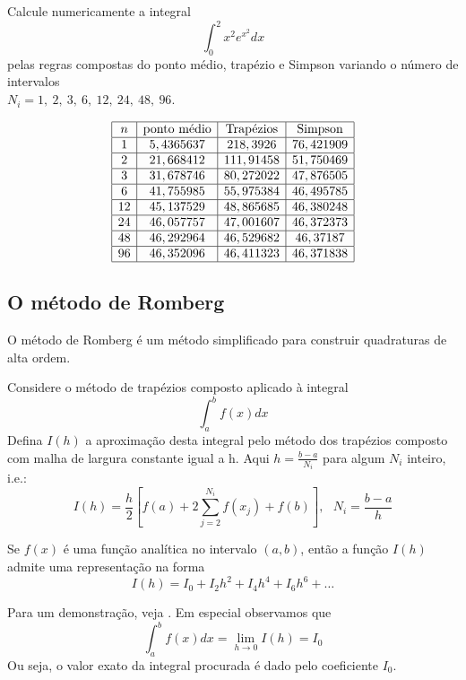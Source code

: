 \begin{ex}Calcule numericamente a integral
$$
\int_0^2 x^2 e^{x^2}dx
$$
pelas regras compostas do ponto médio, trapézio e Simpson variando o número de intervalos \\$N_i=1,\ 2,\ 3,\ 6,\ 12,\ 24,\ 48,\ 96$.
\end{ex}
\begin{equation*}
\begin{array}{|c|c|c|c|}
\hline
n&\hbox{ponto médio}&\hbox{Trapézios}&\hbox{Simpson}\\\hline
1&5,4365637&218,3926&76,421909\\\hline
2&21,668412&111,91458&51,750469\\\hline
3&31,678746&80,272022&47,876505\\\hline
6&41,755985&55,975384&46,495785\\\hline
12&45,137529&48,865685&46,380248\\\hline
24&46,057757&47,001607&46,372373\\\hline
48&46,292964&46,529682&46,37187\\\hline
96&46,352096&46,411323&46,371838\\
\hline
\end{array}  
\end{equation*}

\subsection{O método de Romberg}
O método de Romberg é um método simplificado para construir quadraturas de alta ordem.

Considere o método de trapézios composto aplicado à integral
$$\int_a^bf(x)dx$$
Defina $I(h)$ a aproximação desta integral pelo método dos trapézios composto com  malha de largura constante igual a h. Aqui $h=\frac{b-a}{N_i}$ para algum $N_i$ inteiro, i.e.:
$$I(h)=\frac{h}{2}\left[f(a)+2\sum_{j=2}^{N_i} f(x_j)+ f(b)\right],~~~N_i=\frac{b-a}{h}$$

\begin{teo} Se $f(x)$ é uma função analítica no intervalo $(a,b)$, então a função $I(h)$ admite uma representação na forma
$$I(h)=I_0 + I_2 h^2 + I_4{h^4}+ I_6{h^6}+\ldots$$
\end{teo}
Para um demonstração, veja \cite{DEMAILLY}. Em especial observamos que
$$\int_a^b f(x)dx = \lim_{h\to 0}I(h)=I_0$$
Ou seja, o valor exato da integral procurada é dado pelo coeficiente $I_0$.

